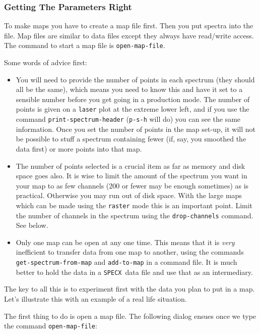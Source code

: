 \documentclass[11pt,twoside]{starlink}
\providecommand{\SPECX}{\texttt{SPECX}}
\begin{document}
\subsubsection{Getting The Parameters Right}
\label{sec:specx_13.1}
To make maps you have to create a map file first.  Then you put
spectra into the file.  Map files are similar to data files except
they always have read/write access.  The command to start a map file
is \texttt{open-map-file}.

Some words of advice first:
\begin{itemize}
\item
You will need to provide the number of points in each spectrum (they
should all be the same), which means you need to know this and have it
set to a sensible number before you get going in a production
mode. The number of points is given on a \texttt{laser} plot at the
extreme lower left, and if you use the command \texttt{print-spectrum-header} ({\tt{p-s-h}} will do) you can see the same
information. Once you set the number of points in the map set-up, it
will not be possible to stuff a spectrum containing fewer (if, say,
you smoothed the data first) or more points into that map.
\item
The number of points selected is a crucial item as far as memory and
disk space goes also. It is wise to limit the amount of the spectrum
you want in your map to as few channels (200 or fewer may be enough
sometimes) as is practical. Otherwise you may run out of disk
space. With the large maps which can be made using the \texttt{raster}
mode this is an important point. Limit the number of channels in the
spectrum using the \texttt{drop-channels} command. See below.
\item
Only one map can be open at any one time. This means that it is \textit{very} inefficient to transfer data from one map to another, using the
commands
\verb|get-spectrum-from-map| and \texttt{add-to-map} in a command file. It is
much better to hold the data in a \SPECX\ data file and use that as an
intermediary.
\end{itemize}

The key to all this is to experiment first with the data you plan to
put in a map. Let's illustrate this with an example of a real life
situation.

The first thing to do is open a map file. The following dialog ensues once we
type the command \texttt{open-map-file}:
\end{document}
